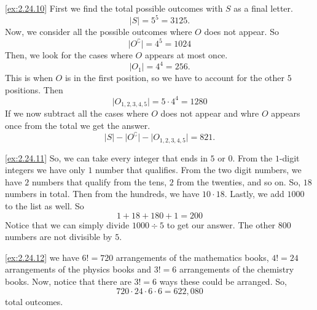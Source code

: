 \begin{solution}\label{sol:2.24.10}\ref{ex:2.24.10}
    First we find the total possible outcomes with $S$ as a final letter. 
    $$
    \lvert S \rvert=5^{5}=3125.
    $$
    Now, we consider all the possible outcomes where $O$ does not appear. So 
    $$
    \lvert O^{\complement} \rvert= 4^{5}=1024
    $$
    Then, we look for the cases where $O$ appears at most once. 
    $$
    \lvert O_{1} \rvert= 4^4=256.
    $$
    This is when $O$ is in the first position, so we have to account for the other $5$ positions. Then 
    $$
    \lvert O_{1,2,3,4,5} \rvert= 5\cdot 4^{4}=1280
    $$
    If we now subtract all the cases where $O$ does not appear and whre $O$ appears once from the total we get the answer. 
    $$
    \lvert S \rvert-\lvert O^{\complement} \rvert-\lvert O_{1,2,3,4,5} \rvert=821.
    $$
\end{solution}

\begin{solution}\label{sol:2.24.11}\ref{ex:2.24.11}
    So, we can take every integer that ends in $5$ or $0$. From the $1$-digit integers we have only $1$ number that qualifies. From the two digit numbers, we have $2$ numbers that qualify from the tens, $2$ from the twenties, and so on. So, $18$ numbers in total. Then from the hundreds, we have $10\cdot 18$. Lastly, we add $1000$ to the list as well. So 
    $$
    1 + 18 + 180 + 1= 200
    $$
    Notice that we can simply divide $1000\div 5$ to get our answer. The other $800$ numbers are not divisible by $5$. 
\end{solution}

\begin{solution}\label{sol:2.24.12}\ref{ex:2.24.12}
    we have $6!=720$ arrangements of the mathematics books, $4!=24$ arrangements of the physics books and $3!=6$ arrangements of the chemistry books. Now, notice that there are $3!=6$ ways these could be arranged. So, 
    $$
    720\cdot 24\cdot 6\cdot 6 = 622,080
    $$
    total outcomes. 
\end{solution}